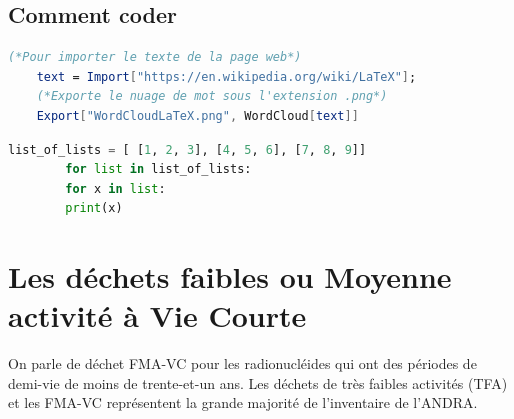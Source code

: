 \documentclass[french, babel]{article}
\begin{document}
\subsection[Sous-section]{Comment coder}
	\lipsum[15-16]
	\begin{lstlisting}[language=Mathematica, caption=Exemple Mathematica]
	(*Pour importer le texte de la page web*)
	text = Import["https://en.wikipedia.org/wiki/LaTeX"];
	(*Exporte le nuage de mot sous l'extension .png*)
	Export["WordCloudLaTeX.png", WordCloud[text]]
	\end{lstlisting}
	\begin{multicols}{3}
		\lipsum[16-17]
	\end{multicols}
	\begin{lstlisting}[language=Python,caption={Exemple Python\protect\footnotemark\relax}]
		list_of_lists = [ [1, 2, 3], [4, 5, 6], [7, 8, 9]]
		for list in list_of_lists:
		for x in list:
		print(x)
	\end{lstlisting}
	\begin{multicols}{3}
		\lipsum[17-18]
	\end{multicols}
\section[Les d\'echets  FMA-VC]{Les d\'echets faibles ou Moyenne activit\'e \`a Vie Courte}
	On parle de d\'echet FMA-VC pour les radionucl\'eides qui ont des p\'eriodes de demi-vie de moins de trente-et-un ans. Les d\'echets de tr\`es faibles activit\'es (TFA) et les FMA-VC repr\'esentent la grande majorit\'e de l'inventaire de l'ANDRA.
\pagebreak

{
	\let\footnotemark\relax
	\lstlistoflistings
}
	\listoffigures
	
\end{document}
